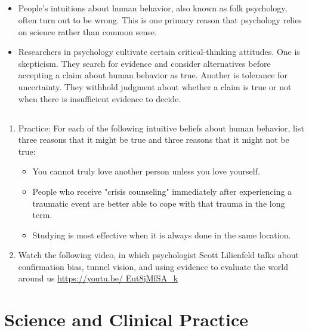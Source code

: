 \subsection{}
\begin{fullwidth}
\begin{itemize}
\item People's intuitions about human behavior, also known as folk psychology, often turn out to be wrong. This is one primary reason that psychology relies on science rather than common sense.
\item Researchers in psychology cultivate certain critical-thinking attitudes. One is skepticism. They search for evidence and consider alternatives before accepting a claim about human behavior as true. Another is tolerance for uncertainty. They withhold judgment about whether a claim is true or not when there is insufficient evidence to decide.
\end{itemize}
\end{fullwidth}

\subsection{}
\begin{fullwidth}
\begin{enumerate}
\item Practice: For each of the following intuitive beliefs about human behavior, list three reasons that it might be true and three reasons that it might not be true:
\begin{itemize}
\item You cannot truly love another person unless you love yourself.
\item People who receive "crisis counseling" immediately after experiencing a traumatic event are better able to cope with that trauma in the long term.
\item Studying is most effective when it is always done in the same location.
\end{itemize}
\item Watch the following video, in which psychologist Scott Lilienfeld talks about confirmation bias, tunnel vision, and using evidence to evaluate the world around us \url{https://youtu.be/ Eut8jMfSA_k}
\end{enumerate}
\end{fullwidth}

\newpage
\section{Science and Clinical Practice}


